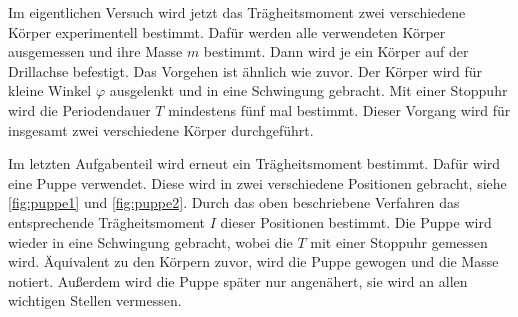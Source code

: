 Im eigentlichen Versuch wird jetzt das Trägheitsmoment zwei verschiedene Körper experimentell bestimmt. 
Dafür werden alle verwendeten Körper ausgemessen und ihre Masse $m$ bestimmt. 
Dann wird je ein Körper auf der Drillachse befestigt. 
Das Vorgehen ist ähnlich wie zuvor. 
Der Körper wird für kleine Winkel $\varphi$ ausgelenkt und in eine Schwingung gebracht. 
Mit einer Stoppuhr wird die Periodendauer $T$ mindestens fünf mal bestimmt. 
Dieser Vorgang wird für insgesamt zwei verschiedene Körper durchgeführt.

Im letzten Aufgabenteil wird erneut ein Trägheitsmoment bestimmt. Dafür wird eine Puppe  verwendet.
Diese wird in zwei verschiedene Positionen gebracht, siehe \autoref{fig:puppe1} und \autoref{fig:puppe2}. Durch das oben beschriebene Verfahren das entsprechende Trägheitsmoment $I$ dieser Positionen bestimmt. 
Die Puppe wird wieder in eine Schwingung gebracht, wobei die $T$ mit einer Stoppuhr gemessen wird.
Äquivalent zu den Körpern zuvor, wird die Puppe gewogen und die Masse notiert. Außerdem wird die Puppe später nur angenähert, sie wird an allen wichtigen Stellen vermessen.

